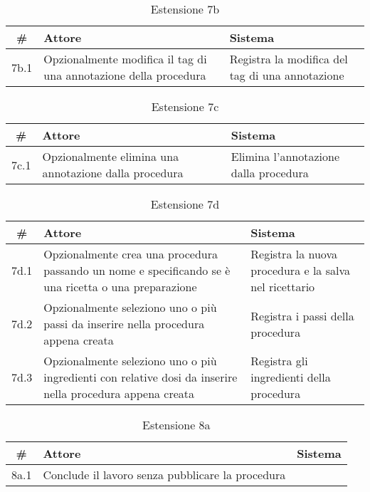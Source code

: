 \begin{table}[H]\centering\caption*{Estensione 7b}
      \small
      \begin{tabular}{|c|p{7cm}|p{6.24cm}|}
            \hline\bfseries \# & \bfseries Attore                                      & \bfseries Sistema                     \\\hline
            7b.1               & Opzionalmente modifica il tag di una annotazione della procedura & Registra la modifica del tag di una annotazione \\\hline
      \end{tabular}
\end{table}

\begin{table}[H]\centering\caption*{Estensione 7c}
      \small
      \begin{tabular}{|c|p{7cm}|p{6.24cm}|}
            \hline\bfseries \# & \bfseries Attore                                      & \bfseries Sistema                     \\\hline
            7c.1               & Opzionalmente elimina una annotazione dalla procedura & Elimina l’annotazione dalla procedura \\\hline
      \end{tabular}
\end{table}

\begin{table}[H]\centering\caption*{Estensione 7d}
      \small
      \begin{tabular}{|c|p{7cm}|p{6.24cm}|}
            \hline\bfseries \# & \bfseries Attore                                                                                          & \bfseries Sistema                                     \\\hline
            7d.1               & Opzionalmente crea una procedura passando un nome e specificando se è una ricetta o una preparazione      & Registra la nuova procedura e la salva nel ricettario \\\hline
            7d.2               & Opzionalmente seleziono uno o più passi da inserire nella procedura appena creata                         & Registra i passi della procedura                      \\\hline
            7d.3               & Opzionalmente seleziono uno o più ingredienti con relative dosi da inserire nella procedura appena creata & Registra gli ingredienti della procedura              \\\hline
      \end{tabular}
\end{table}

\begin{table}[H]\centering\caption*{Estensione 8a}
      \small
      \begin{tabular}{|c|p{7cm}|p{6.24cm}|}
            \hline\bfseries \# & \bfseries Attore                                 & \bfseries Sistema \\\hline
            8a.1               & Conclude il lavoro senza pubblicare la procedura &                   \\\hline
      \end{tabular}
\end{table}
\normalsize